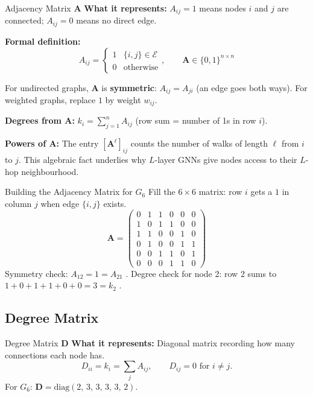 \begin{mathbox}{Adjacency Matrix $\mathbf{A}$}
\textbf{What it represents:} $A_{ij} = 1$ means nodes $i$ and $j$ are connected; $A_{ij} = 0$ means no direct edge.

\textbf{Formal definition:}
\[
A_{ij} = \begin{cases} 1 & \{i,j\} \in \mathcal{E} \\ 0 & \text{otherwise} \end{cases}, \qquad \mathbf{A} \in \{0,1\}^{n \times n}
\]

For undirected graphs, $\mathbf{A}$ is \textbf{symmetric}: $A_{ij} = A_{ji}$ (an edge goes both ways). For weighted graphs, replace $1$ by weight $w_{ij}$.

\textbf{Degrees from $\mathbf{A}$:} $k_i = \sum_{j=1}^n A_{ij}$ (row sum = number of 1s in row $i$).

\textbf{Powers of $\mathbf{A}$:} The entry $[\mathbf{A}^{\ell}]_{ij}$ counts the number of walks of length $\ell$ from $i$ to $j$. This algebraic fact underlies why $L$-layer GNNs give nodes access to their $L$-hop neighbourhood.
\end{mathbox}

\begin{examplebox}{Building the Adjacency Matrix for $G_6$}
Fill the $6 \times 6$ matrix: row $i$ gets a $1$ in column $j$ when edge $\{i,j\}$ exists.
\[
\mathbf{A} = \begin{pmatrix}
0 & 1 & 1 & 0 & 0 & 0 \\
1 & 0 & 1 & 1 & 0 & 0 \\
1 & 1 & 0 & 0 & 1 & 0 \\
0 & 1 & 0 & 0 & 1 & 1 \\
0 & 0 & 1 & 1 & 0 & 1 \\
0 & 0 & 0 & 1 & 1 & 0
\end{pmatrix}
\]
Symmetry check: $A_{12}=1=A_{21}$ \checkmark. \quad Degree check for node 2: row 2 sums to $1+0+1+1+0+0=3=k_2$ \checkmark.
\end{examplebox}

\subsection{Degree Matrix}

\begin{mathbox}{Degree Matrix $\mathbf{D}$}
\textbf{What it represents:} Diagonal matrix recording how many connections each node has.
\[
D_{ii} = k_i = \sum_{j} A_{ij}, \qquad D_{ij} = 0 \text{ for } i \neq j.
\]
For $G_6$: $\mathbf{D} = \mathrm{diag}(2,\, 3,\, 3,\, 3,\, 3,\, 2)$.
\end{mathbox}

